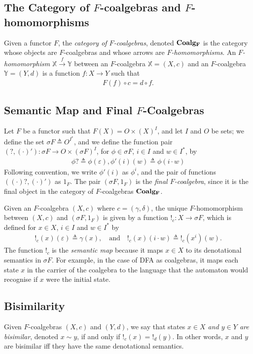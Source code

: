 \subsection{The Category of $F$-coalgebras and $F$-homomorphisms}
Given a functor $F$, the \emph{category of $F$-coalgebras}, denoted $\AsCategory{Coalg_F}$ is the category whose objects are $F$-coalgebras and whose arrows are \emph{$F$-homomorphisms}. An \emph{$F$-homomorphism} $\mathbb{X}\xrightarrow{f} \mathbb{Y}$ between an $F$-coalgebra $\mathbb{X}=(X,c)$ and an $F$-coalgebra $\mathbb{Y}=(Y,d)$ is a function $f\colon X\rightarrow Y$ such that
\begin{align}
    F(f)\circ c = d\circ f.
\end{align}

\subsection{Semantic Map and Final $F$-Coalgebras}
Let $F$ be a functor such that $F(X)=O\times (X)^I$, and let $I$ and $O$ be sets; we define the set $\sigma F\triangleq O^{I^*}$, and we define the function pair $(?, (\cdot)')\colon \sigma F\rightarrow O\times (\sigma F)^I$, for $\phi \in \sigma F$, $i\in I$ and $w\in I^*$, by
\begin{align}
    \phi? \triangleq \phi(\varepsilon),
    \phi'(i)(w) \triangleq \phi(i\cdot w)
\end{align}
Following convention, we write $\phi'(i)$ as $\phi^i$, and the pair of functions $((\cdot) ?, (\cdot)')$ as $1_F$. The pair $(\sigma F, 1_F)$ is the \emph{final $F$-coalgebra}, since it is the final object in the category of $F$-coalgebras $\AsCategory{Coalg_F}$.

Given an $F$-coalgebra $(X,c)$ where $c=(\gamma,\delta)$, the unique $F$-homomorphism between $(X,c)$ and $(\sigma F, 1_F)$ is given by a function $!_c\colon X\rightarrow \sigma F$, which is defined for $x\in X$, $i\in I$ and $w\in I^*$ by 
\begin{align}
    !_c(x)(\varepsilon)\triangleq \gamma(x),\quad \text{and} \quad 
    !_c(x)(i\cdot w)\triangleq !_c(x^i)(w).
\end{align}
The function $!_c$ is the \emph{semantic map} because it maps $x\in X$ to its denotational semantics in $\sigma F$. For example, in the case of DFA as coalgebras, it maps each state $x$ in the carrier of the coalgebra to the language that the automaton would recognise if $x$ were the initial state.

\subsection{Bisimilarity}
Given $F$-coalgebras $(X,c)$ and $(Y,d)$, we say that states \emph{$x\in X$ and $y\in Y$ are bisimilar}, denoted $x\sim y$, if and only if $!_c(x)=!_d(y)$. In other words, $x$ and $y$ are bisimilar iff they have the same denotational semantics.

